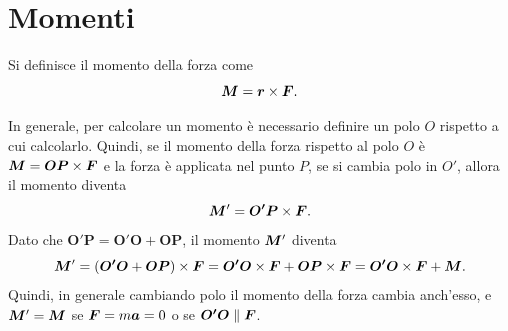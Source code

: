 \section{Momenti}
\begin{defn}
    Si definisce il momento della forza come
    \begin{equation}
        \bm{M}=\bm{r}\times\bm{F}.
    \end{equation}
\end{defn}
In generale, per calcolare un momento è necessario definire un polo $O$ rispetto a cui calcolarlo. Quindi, se il momento della forza rispetto al polo $O$ è $\bm{M}=\bm{OP}\times\bm{F}$ e la forza è applicata nel punto $P$, se si cambia polo in $O'$, allora il momento diventa
\begin{equation}
    \bm{M}'=\bm{O'P}\times\bm{F}.
\end{equation}
Dato che $\bm{O'P}=\bm{O'O}+\bm{OP}$, il momento $\bm{M}'$ diventa
\begin{equation}
    \bm{M}'=(\bm{O'O}+\bm{OP})\times\bm{F}=\bm{O'O}\times\bm{F}+\bm{OP}\times\bm{F}=\bm{O'O}\times\bm{F}+\bm{M}.
\end{equation}
Quindi, in generale cambiando polo il momento della forza cambia anch'esso, e $\bm{M}'=\bm{M}$ se $\bm{F}=m\bm{a}=0$ o se $\bm{O'O}\parallel\bm{F}$.

